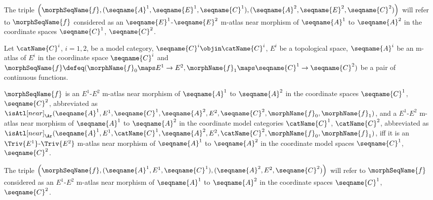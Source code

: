 \documentclass{article}
\begin{document}
\begin{definition}
The triple
$
  \Bigl (
    \morphSeqName{f},
    (\seqname{A}^1, \seqname{E}^1, \seqname{C}^1),
    (\seqname{A}^2, \seqname{E}^2, \seqname{C}^2)
  \Bigr )
$
will refer to $\morphSeqName{f}$ considered as an
$\seqname{E}^1$-$\seqname{E}^2$ m-atlas near morphism of
$\seqname{A}^1$ to $\seqname{A}^2$ in the coordinate spaces
$\seqname{C}^1$, $\seqname{C}^2$.
\end{definition}

\begin{definition}
\label{def:M-ATLmorphtopnear}
Let $\catName{C}^i$, $i=1,2$, be a model category,
$\seqname{C}^i \objin \catName{C}^i$, $E^i$ be a topological space,
$\seqname{A}^i$ be an m-atlas of $E^i$ in the coordinate space
$\seqname{C}^i$ and
$
  \morphSeqName{f} \defeq
  (
    \morphName{f}_0 \maps E^1 \to E^2,
    \morphName{f}_1 \maps \seqname{C}^1 \to \seqname{C}^2
  )
$
be a pair of continuous functions.

$\morphSeqName{f}$ is an $E^1$-$E^2$ m-atlas near morphism of
$\seqname{A}^1$ to $\seqname{A}^2$ in the coordinate spaces
$\seqname{C}^1$, $\seqname{C}^2$, abbreviated as
$
  \isAtl[near]_\Ar
    (
      \seqname{A}^1,
      E^1,
      \seqname{C}^1,
      \seqname{A}^2,
      E^2,
      \seqname{C}^2,
      \morphName{f}_0,
      \morphName{f}_1
    )
$,
and a
$E^1$-$E^2$ m-atlas near morphism of $\seqname{A}^1$ to
$\seqname{A}^2$ in the coordinate model categories $\catName{C}^1$, $\catName{C}^2$,
abbreviated as
$
  \isAtl[near]_\Ar
    (
      \seqname{A}^1,
      E^1,
      \catName{C}^1,
      \seqname{A}^2,
      E^2,
      \catName{C}^2,
      \morphName{f}_0,
      \morphName{f}_1
    )
$,
iff it is an $\Triv{E^1}$-$\Triv{E^2}$ m-atlas near morphism of
$\seqname{A}^1$ to $\seqname{A}^2$ in the coordinate model spaces
$\seqname{C}^1$, $\seqname{C}^2$.

The triple
$
  \Bigl (
    \morphSeqName{f},
    (\seqname{A}^1, E^1, \seqname{C}^1),
    (\seqname{A}^2, E^2, \seqname{C}^2)
  \Bigr )
$
will refer to $\morphSeqName{f}$ considered as an
$E^1$-$E^2$ m-atlas near morphism of
$\seqname{A}^1$ to $\seqname{A}^2$ in the coordinate spaces
$\seqname{C}^1$, $\seqname{C}^2$.
\end{definition}
\end{document}
